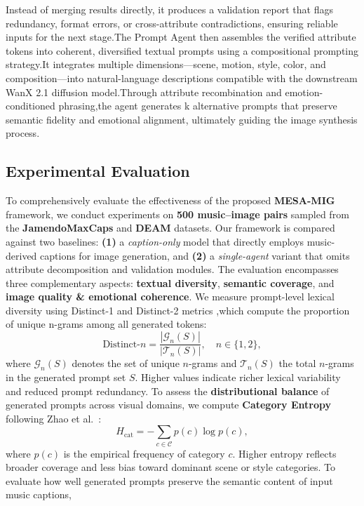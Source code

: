 \documentclass[letterpaper]{article}
\begin{document}
Instead of merging results directly, it produces a validation report that flags redundancy, format errors, or cross-attribute contradictions, ensuring reliable inputs for the next stage.The Prompt Agent then assembles the verified attribute tokens into coherent\cite{choi2024promptofthought}, diversified textual prompts using a compositional prompting strategy.It integrates multiple dimensions—scene, motion, style, color, and composition—into natural-language descriptions compatible with the downstream WanX 2.1 diffusion model\cite{alibaba2024wanx}.Through attribute recombination 
and emotion-conditioned phrasing,the agent generates k alternative prompts that preserve semantic fidelity and emotional alignment, ultimately guiding the image synthesis process.

\subsection{Experimental Evaluation}
To comprehensively evaluate the effectiveness of the proposed \textbf{MESA-MIG} framework, 
we conduct experiments on \textbf{500 music--image pairs} sampled from the 
\textbf{JamendoMaxCaps} and \textbf{DEAM} datasets.
Our framework is compared against two baselines:
\textbf{(1)} a \textit{caption-only} model that directly employs music-derived captions for image generation, 
and \textbf{(2)} a \textit{single-agent} variant that omits attribute decomposition and validation modules.
The evaluation encompasses three complementary aspects: 
\textbf{textual diversity}, \textbf{semantic coverage}, and 
\textbf{image quality \& emotional coherence}.
We measure prompt-level lexical diversity using Distinct-1 and Distinct-2 metrics \cite{li2016diversity},which compute the proportion of unique n-grams among all generated tokens:
\[
\text{Distinct-}n = \frac{|\mathcal{G}_n(S)|}{|\mathcal{T}_n(S)|}, \quad n \in \{1, 2\},
\]
where $\mathcal{G}_n(S)$ denotes the set of unique $n$-grams and $\mathcal{T}_n(S)$ 
the total $n$-grams in the generated prompt set $S$. 
Higher values indicate richer lexical variability and reduced prompt redundancy.
To assess the \textbf{distributional balance} of generated prompts across visual domains, 
we compute \textbf{Category Entropy} following Zhao et al.~\cite{zhao2020emotion}:
\[
H_{\mathrm{cat}} = - \sum_{c \in \mathcal{C}} p(c) \log p(c),
\]
where $p(c)$ is the empirical frequency of category $c$. 
Higher entropy reflects broader coverage and less bias toward dominant scene or style categories.
To evaluate how well generated prompts preserve the semantic content of input music captions, 
\end{document}
